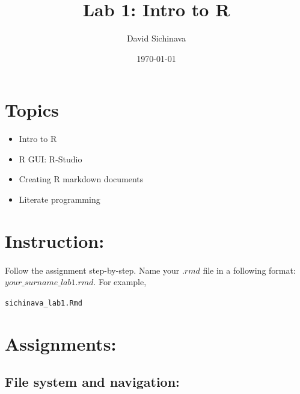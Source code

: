 \documentclass{article}\usepackage[]{graphicx}\usepackage[]{color}
\title{Lab 1: Intro to R}
\author{David Sichinava}
\date{\today}
\makeatletter
\newcommand{\hlstd}[1]{\textcolor[rgb]{0.345,0.345,0.345}{#1}}%
\newenvironment{kframe}{%
 \def\at@end@of@kframe{}%
 \ifinner\ifhmode%
  \def\at@end@of@kframe{\end{minipage}}%
  \begin{minipage}{\columnwidth}%
 \fi\fi%
 \def\FrameCommand##1{\hskip\@totalleftmargin \hskip-\fboxsep
 \colorbox{shadecolor}{##1}\hskip-\fboxsep
     \hskip-\linewidth \hskip-\@totalleftmargin \hskip\columnwidth}%
 \MakeFramed {\advance\hsize-\width
   \@totalleftmargin\z@ \linewidth\hsize
   \@setminipage}}%
 {\par\unskip\endMakeFramed%
 \at@end@of@kframe}
\newenvironment{knitrout}{}{} %
\makeatother
\begin{document}
\maketitle
\section*{Topics}
\begin{itemize}
\item Intro to R
\item R GUI: R-Studio
\item Creating R markdown documents
\item Literate programming
\end{itemize}

\section*{Instruction:}

\paragraph{}
Follow the assignment step-by-step. Name your $.rmd$ file in a following format: $your\_surname\_lab1.rmd$. For example,

\begin{knitrout}
\color{fgcolor}\begin{kframe}
\begin{alltt}
\hlstd{sichinava_lab1.Rmd}
\end{alltt}
\end{kframe}
\end{knitrout}

\section*{Assignments:}

\subsection*{File system and navigation:}
\end{document}
